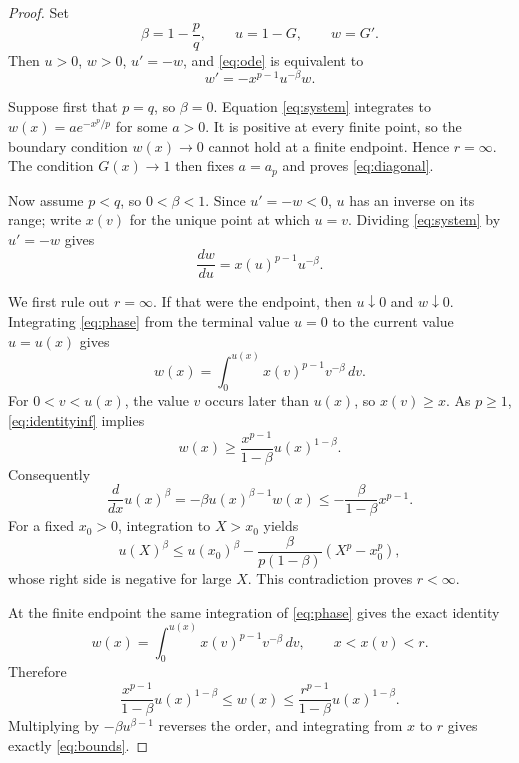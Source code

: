 \documentclass[10pt]{article}
\begin{document}
\begin{proof}
Set
\[
 \beta=1-\frac pq,\qquad u=1-G,\qquad w=G'.
\]
Then $u>0$, $w>0$, $u'=-w$, and \eqref{eq:ode} is equivalent to
\begin{equation}\label{eq:system}
                         w'=-x^{p-1}u^{-\beta}w.
\end{equation}

Suppose first that $p=q$, so $\beta=0$.  Equation \eqref{eq:system}
integrates to $w(x)=a e^{-x^p/p}$ for some $a>0$.  It is positive at every
finite point, so the boundary condition $w(x)\to0$ cannot hold at a finite
endpoint.  Hence $r=\infty$.  The condition $G(x)\to1$ then fixes $a=a_p$
and proves \eqref{eq:diagonal}.

Now assume $p<q$, so $0<\beta<1$.  Since $u'=-w<0$, $u$ has an inverse on
its range; write $x(v)$ for the unique point at which $u=v$.  Dividing
\eqref{eq:system} by $u'=-w$ gives
\begin{equation}\label{eq:phase}
                       \frac{dw}{du}=x(u)^{p-1}u^{-\beta}.
\end{equation}

We first rule out $r=\infty$.  If that were the endpoint, then $u\downarrow0$
and $w\downarrow0$.  Integrating \eqref{eq:phase} from the terminal value
$u=0$ to the current value $u=u(x)$ gives
\begin{equation}\label{eq:identityinf}
 w(x)=\int_0^{u(x)}x(v)^{p-1}v^{-\beta}\,dv.
\end{equation}
For $0<v<u(x)$, the value $v$ occurs later than $u(x)$, so $x(v)\ge x$.
As $p\ge1$, \eqref{eq:identityinf} implies
\begin{equation}\label{eq:lowerw}
 w(x)\ge \frac{x^{p-1}}{1-\beta}u(x)^{1-\beta}.
\end{equation}
Consequently
\[
 \frac{d}{dx}u(x)^\beta
 =-\beta u(x)^{\beta-1}w(x)
 \le-\frac{\beta}{1-\beta}x^{p-1}.
\]
For a fixed $x_0>0$, integration to $X>x_0$ yields
\[
 u(X)^\beta
 \le u(x_0)^\beta
 -\frac{\beta}{p(1-\beta)}(X^p-x_0^p),
\]
whose right side is negative for large $X$.  This contradiction proves
$r<\infty$.

At the finite endpoint the same integration of \eqref{eq:phase} gives the
exact identity
\begin{equation}\label{eq:identity}
 w(x)=\int_0^{u(x)}x(v)^{p-1}v^{-\beta}\,dv,
 \qquad x<x(v)<r.
\end{equation}
Therefore
\begin{equation}\label{eq:w-sandwich}
 \frac{x^{p-1}}{1-\beta}u(x)^{1-\beta}
 \le w(x)
 \le\frac{r^{p-1}}{1-\beta}u(x)^{1-\beta}.
\end{equation}
Multiplying by $-\beta u^{\beta-1}$ reverses the order, and integrating from
$x$ to $r$ gives exactly \eqref{eq:bounds}.


\end{proof}
\end{document}
